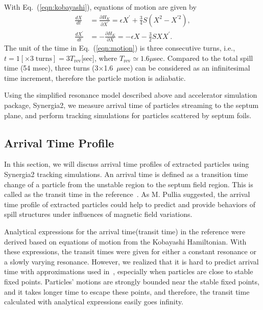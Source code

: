 \documentclass[aps,prstab,onecolumn,preprint]{revtex4-1}
\begin{document}
With Eq.~(\ref{eqn:kobayashi}), equations of motion are given by
\begin{equation}
 \begin{split}
  \frac{dX}{dt} & = \frac{\partial H_{K}}{\partial X^{\prime}}
                  = \epsilon X^{\prime} + \frac{3}{4} S
                    \left(
                      X^{2} - X^{\prime 2}
                    \right), \\
  \frac{dX^{\prime}}{dt} & = - \frac{\partial H_{K}}{\partial X}
                           = - \epsilon X - \frac{3}{2} S X X^{\prime}.
 \end{split}
\label{eqn:motion}
\end{equation}
The unit of the time in Eq.~(\ref{eqn:motion}) is three consecutive turns, i.e., $t = 1 [\times 3 \; \text{turns}] = 3 T_{\text{rev}}$[sec], where $T_{\text{rev}} \simeq 1.6 \mu$sec.
Compared to the total spill time (54 msec), three turns (3$\times$1.6~$\mu$sec) can be considered as an infinitesimal time increment, therefore the particle motion is adiabatic. 

Using the simplified resonance model described above and accelerator simulation package, Synergia2, we measure arrival time of particles streaming to the septum plane, and perform tracking simulations for particles scattered by septum foils.


\subsection{\label{sec:arrival}Arrival Time Profile}

In this section, we will discuss arrival time profiles of extracted particles using Synergia2 tracking simulations. An arrival time is defined as a transition time change of a particle from the unstable region to the septum field region. This is called as the transit time in the reference~\cite{pullia}. As M. Pullia suggested, the arrival time profile of extracted particles could help to predict and provide behaviors of spill structures under influences of magnetic field variations.

Analytical expressions for the arrival time(transit time) in the reference \cite{pullia} were derived based on equations of motion from the Kobayashi Hamiltonian. With these expressions, the transit times were given for either a constant resonance or a slowly varying resonance. However, we realized that it is hard to predict arrival time with approximations used in~\cite{pullia}, especially when particles are close to stable fixed points. Particles' motions are strongly bounded near the stable fixed points, and it takes longer time to escape these points, and therefore, the transit time calculated with analytical expressions easily goes infinity.
\end{document}
